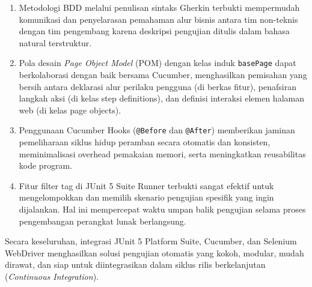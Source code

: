 \documentclass[a4paper,oneside,11pt]{book}
\begin{document}
\begin{enumerate}
    \item Metodologi BDD melalui penulisan sintaks Gherkin terbukti mempermudah komunikasi dan penyelarasan pemahaman alur bisnis antara tim non-teknis dengan tim pengembang karena deskripsi pengujian ditulis dalam bahasa natural terstruktur.
    \item Pola desain \textit{Page Object Model} (POM) dengan kelas induk \texttt{basePage} dapat berkolaborasi dengan baik bersama Cucumber, menghasilkan pemisahan yang bersih antara deklarasi alur perilaku pengguna (di berkas fitur), penafsiran langkah aksi (di kelas step definitions), dan definisi interaksi elemen halaman web (di kelas page objects).
    \item Penggunaan Cucumber Hooks (\texttt{@Before} dan \texttt{@After}) memberikan jaminan pemeliharaan siklus hidup peramban secara otomatis dan konsisten, meminimalisasi overhead pemakaian memori, serta meningkatkan reusabilitas kode program.
    \item Fitur filter tag di JUnit 5 Suite Runner terbukti sangat efektif untuk mengelompokkan dan memilih skenario pengujian spesifik yang ingin dijalankan. Hal ini mempercepat waktu umpan balik pengujian selama proses pengembangan perangkat lunak berlangsung.
\end{enumerate}

Secara keseluruhan, integrasi JUnit 5 Platform Suite, Cucumber, dan Selenium WebDriver menghasilkan solusi pengujian otomatis yang kokoh, modular, mudah dirawat, dan siap untuk diintegrasikan dalam siklus rilis berkelanjutan (\textit{Continuous Integration}).
\end{document}
